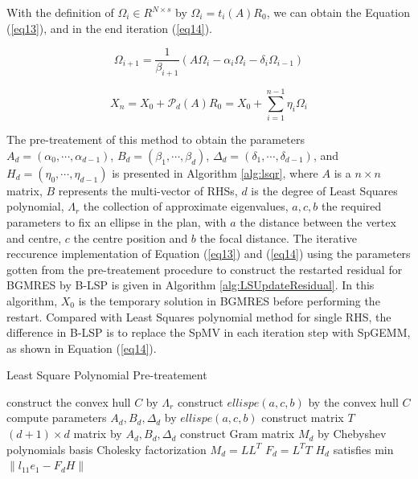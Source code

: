 With the definition of \(\Omega_i \in R^{N \times s}\) by \(\Omega_i=t_i(A)R_0\), we can obtain the Equation (\ref{eq13}), and in the end iteration  (\ref{eq14}).

\begin{equation}
\label{eq13}
\Omega_{i+1}=\frac{1}{\beta_{i+1}}(A\Omega_i-\alpha_i\Omega_i-\delta_i\Omega_{i-1})
\end{equation}

\begin{equation}
\label{eq14}
X_n=X_0+\mathcal{P}_d(A)R_0=X_0+\sum_{i=1}^{n-1}\eta_i\Omega_i
\end{equation}

The pre-treatement of this method to obtain the parameters $A_d=(\alpha_0, \cdots, \alpha_{d-1})$, $B_d=(\beta_1, \cdots, \beta_d)$, $\Delta_d=(\delta_1, \cdots, \delta_{d-1})$, and $H_d=(\eta_0, \cdots, \eta_{d-1})$ is presented in Algorithm \ref{alg:lsqr}, where $A$ is a $n\times n$ matrix, $B$ represents the multi-vector of RHSs, $d$ is the degree of Least Squares polynomial, $\Lambda_r$ the collection of approximate eigenvalues, $a,c,b$ the required parameters to fix an ellipse in the plan, with $a$ the distance between the vertex and centre, $c$ the centre position and $b$ the focal distance. The iterative reccurence implementation of Equation (\ref{eq13}) and (\ref{eq14}) using the parameters gotten from the pre-treatement procedure to construct the restarted residual for BGMRES by B-LSP is given in Algorithm \ref{alg:LSUpdateResidual}. In this algorithm, $X_0$ is the temporary solution in BGMRES before performing the restart. Compared with Least Squares polynomial method for single RHS, the difference in B-LSP is to replace the SpMV in each iteration step with SpGEMM, as shown in Equation (\ref{eq14}).

\begin{algorithm}[htbp]
	\caption{Least Square Polynomial Pre-treatement}
	\label{alg:lsqr}
	\begin{algorithmic}[1]
		\State construct the convex hull $C$ by $\Lambda_r$
		\State construct $ellispe(a,c,b)$ by the convex hull $C$
		\State compute parameters $A_d, B_d, \Delta_d$ by $ellispe(a,c,b)$
		\State construct matrix $T$ ${(d+1)} \times d$ matrix by $A_d, B_d, \Delta_d$
		\State construct Gram matrix $M_d$ by Chebyshev polynomials basis
		\State Cholesky factorization $M_d=LL^T$
		\State $F_d=L^TT$
		\State $H_d$ satisfies min $\|l_{11}e_1-F_d H\|$
		\EndFunction
	\end{algorithmic}
\end{algorithm}

